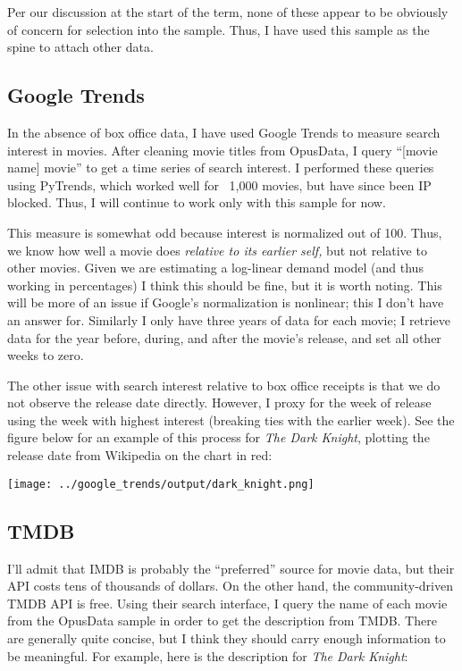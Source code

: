\documentclass{article}
\begin{document}
Per our discussion at the start of the term, none of these appear to be obviously of concern for selection into the sample. Thus, I have used this sample as the spine to attach other data. 

\subsection{Google Trends}

In the absence of box office data, I have used Google Trends to measure search interest in movies. After cleaning movie titles from OpusData, I query ``[movie name] movie'' to get a time series of search interest. I performed these queries using PyTrends, which worked well for ~1,000 movies, but have since been IP blocked. Thus, I will continue to work only with this sample for now. 

This measure is somewhat odd because interest is normalized out of 100. Thus, we know how well a movie does \emph{relative to its earlier self,} but not relative to other movies. Given we are estimating a log-linear demand model (and thus working in percentages) I think this should be fine, but it is worth noting. This will be more of an issue if Google's normalization is nonlinear; this I don't have an answer for. Similarly I only have three years of data for each movie; I retrieve data for the year before, during, and after the movie's release, and set all other weeks to zero. 

The other issue with search interest relative to box office receipts is that we do not observe the release date directly. However, I proxy for the week of release using the week with highest interest (breaking ties with the earlier week). See the figure below for an example of this process for \textit{The Dark Knight}, plotting the release date from Wikipedia on the chart in red:

\begin{center}
    \texttt{[image: ../google\_trends/output/dark\_knight.png]}
\end{center}

\subsection{TMDB}

I'll admit that IMDB is probably the ``preferred'' source for movie data, but their API costs tens of thousands of dollars. On the other hand, the community-driven TMDB API is free. Using their search interface, I query the name of each movie from the OpusData sample in order to get the description from TMDB. There are generally quite concise, but I think they should carry enough information to be meaningful. For example, here is the description for \textit{The Dark Knight}:
\end{document}
